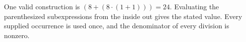 One valid construction is $\boxed{(8+(8\cdot (1+1)))=24}$. Evaluating the parenthesized subexpressions from the inside out gives the stated value. Every supplied occurrence is used once, and the denominator of every division is nonzero.
